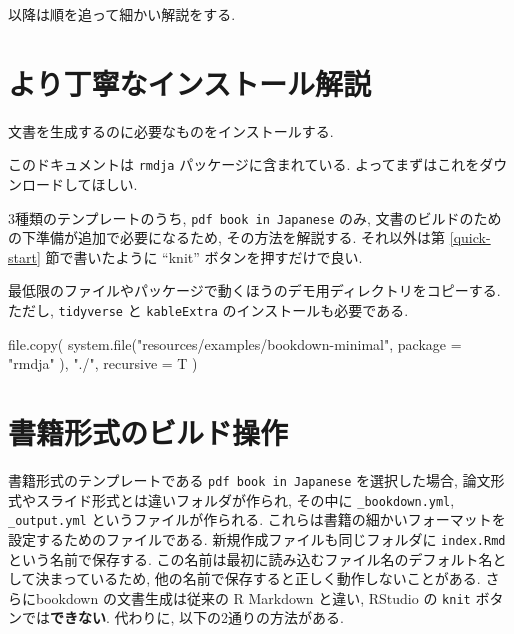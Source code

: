 \documentclass[
  xelatex,ja=standard,jafont=noto]{bxjsbook}
\newenvironment{Shaded}{\begin{snugshade}}{\end{snugshade}}
\newcommand{\AttributeTok}[1]{\textcolor[rgb]{0.77,0.63,0.00}{#1}}
\newcommand{\FunctionTok}[1]{\textcolor[rgb]{0.00,0.00,0.00}{#1}}
\newcommand{\NormalTok}[1]{#1}
\newcommand{\StringTok}[1]{\textcolor[rgb]{0.31,0.60,0.02}{#1}}
\theoremstyle{definition}
\theoremstyle{definition}
\theoremstyle{definition}
\theoremstyle{definition}
\theoremstyle{remark}
\begin{document}
以降は順を追って細かい解説をする.

\hypertarget{ux3088ux308aux4e01ux5be7ux306aux30a4ux30f3ux30b9ux30c8ux30fcux30ebux89e3ux8aac}{%
\section{より丁寧なインストール解説}\label{ux3088ux308aux4e01ux5be7ux306aux30a4ux30f3ux30b9ux30c8ux30fcux30ebux89e3ux8aac}}

文書を生成するのに必要なものをインストールする.

このドキュメントは \texttt{rmdja} パッケージに含まれている.
よってまずはこれをダウンロードしてほしい.

3種類のテンプレートのうち, \texttt{pdf\ book\ in\ Japanese} のみ,
文書のビルドのための下準備が追加で必要になるため, その方法を解説する.
それ以外は第 \ref{quick-start} 節で書いたように ``knit''
ボタンを押すだけで良い.

最低限のファイルやパッケージで動くほうのデモ用ディレクトリをコピーする.
ただし, \texttt{tidyverse} と \texttt{kableExtra}
のインストールも必要である.

\begin{Shaded}
\begin{Highlighting}[numbers=left,,]
\FunctionTok{file.copy}\NormalTok{(}
  \FunctionTok{system.file}\NormalTok{(}\StringTok{"resources/examples/bookdown{-}minimal"}\NormalTok{,}
    \AttributeTok{package =} \StringTok{"rmdja"}
\NormalTok{  ),}
  \StringTok{"./"}\NormalTok{,}
  \AttributeTok{recursive =}\NormalTok{ T}
\NormalTok{)}
\end{Highlighting}
\end{Shaded}

\hypertarget{ux66f8ux7c4dux5f62ux5f0fux306eux30d3ux30ebux30c9ux64cdux4f5c}{%
\section{書籍形式のビルド操作}\label{ux66f8ux7c4dux5f62ux5f0fux306eux30d3ux30ebux30c9ux64cdux4f5c}}

書籍形式のテンプレートである \texttt{pdf\ book\ in\ Japanese}
を選択した場合, 論文形式やスライド形式とは違いフォルダが作られ, その中に
\texttt{\_bookdown.yml}, \texttt{\_output.yml} というファイルが作られる.
これらは書籍の細かいフォーマットを設定するためのファイルである.
新規作成ファイルも同じフォルダに \texttt{index.Rmd}
という名前で保存する.
この名前は最初に読み込むファイル名のデフォルト名として決まっているため,
他の名前で保存すると正しく動作しないことがある. さらにbookdown
の文書生成は従来の R Markdown と違い, RStudio の \texttt{knit}
ボタンでは\textbf{できない}. 代わりに, 以下の2通りの方法がある.
\end{document}
